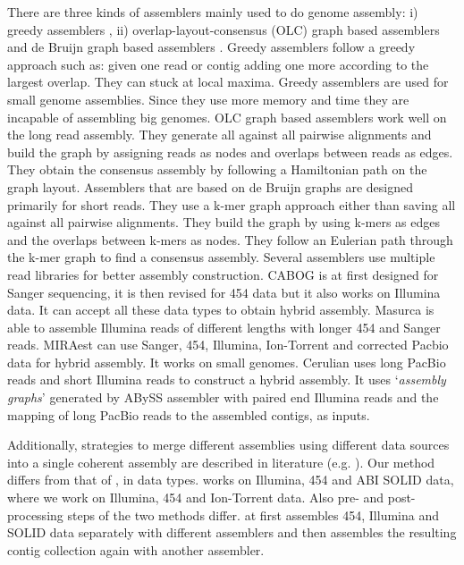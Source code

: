 \documentclass{llncs}
\begin{document}
There are three kinds of assemblers mainly used to do genome assembly: i) greedy assemblers \cite{ssake:2007,sharcgs:2007,vcake:2007}, ii) overlap-layout-consensus (OLC) graph based assemblers \cite{celera:2000, sga:2012, hapsemblerDonmez:2011} and de Bruijn graph based assemblers \cite{eulerPevzner:2008, abyssSimpson:2009, velvetZerbino:2008, spadesBankevich:2012, allpaths:2008}. Greedy assemblers follow a greedy approach such as: given one read or contig adding one more according to the largest overlap. They can stuck at local maxima. Greedy assemblers are used for small genome assemblies. Since they use more memory and time they are incapable of assembling big genomes. 
OLC graph based assemblers work well on the long read assembly. They generate all against all pairwise alignments and build the graph by assigning reads as nodes and overlaps between reads as edges. 
They obtain the consensus assembly by following a Hamiltonian path on the graph layout. 
Assemblers that are based on de Bruijn graphs are designed primarily for short reads. 
They use a k-mer graph approach either than saving all against all pairwise alignments. They build the graph by using k-mers as edges and the overlaps between k-mers as nodes. They follow an Eulerian path through the k-mer graph to find a consensus assembly.
Several assemblers use multiple read libraries \cite{cabogMiller:2008, masurcaZimin:2013, miraest, cerulian:2013} for better assembly construction. CABOG \cite{cabogMiller:2008} is at first designed for Sanger sequencing, it is then revised for 454 data but it also works on Illumina data. It can accept all these data types to obtain hybrid assembly. Masurca \cite{masurcaZimin:2013} is able to assemble Illumina reads of different lengths with longer 454 and Sanger reads. MIRAest \cite{miraest} can use Sanger, 454, Illumina, Ion-Torrent and corrected Pacbio data for hybrid assembly. It works on small genomes. Cerulian \cite{cerulian:2013} uses long PacBio reads and short Illumina reads to construct a hybrid assembly. It uses `\textit{assembly graphs}' generated by ABySS \cite{abyssSimpson:2009} assembler with paired end Illumina reads and the mapping of long PacBio reads to the assembled contigs, as inputs.

Additionally, strategies to merge different assemblies using different data sources into a single coherent assembly are described in literature (e.g. \cite{wang:2012}). Our method differs from that of \cite{wang:2012}, in data types. \cite{wang:2012} works on Illumina, 454 and ABI SOLID data, where we work on Illumina, 454 and Ion-Torrent data. Also pre- and post-processing steps of the two methods differ. \cite{wang:2012} at first assembles 454, Illumina and SOLID data separately with different assemblers and then assembles the resulting contig collection again with another assembler.
\end{document}
